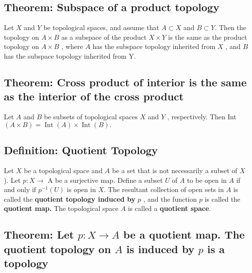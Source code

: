 \documentclass[12pt]{article}
\begin{document}
\subsection{Theorem: Subspace of a product topology}
	Let $X$ and $Y$ be topological spaces, and assume that $A \subset X$ and $B \subset Y .$ Then the topology on $A \times B$ as a subspace of the product $X \times Y$ is the same as the product topology on $A \times B$ , where $A$ has the subspace topology inherited from $X$ , and $B$ has the subspace topology inherited from Y.
\subsection{Theorem: Cross product of interior is the same as the interior of the cross product}
	Let $A$ and $B$ be subsets of topological spaces $X$ and $Y$ ,
	respectively. Then Int $( A \times B ) = \operatorname { Int } ( A ) \times \operatorname { Int } ( B) .$
\subsection{Definition: Quotient Topology}
	Let $X$ be a topological space and $A$ be a set that is not necessarily a subset of $X$ ). Let $p : X \rightarrow$ A be a surjective map. Define a subset $ U $ of $ A $ to be open in $ A $ if and only if $p ^ { - 1 } ( U )$ is open in $X .$ The resultant collection of open sets in $A$ is called the \textbf{quotient topology induced by} $p$ , and the function $ p $ is called the \textbf{quotient map.} The topological space $ A $ is called a \textbf{quotient space}.
\subsection{Theorem: Let $p : X \rightarrow A$ be a quotient map. The quotient topology on $ A $ is induced by $ p $ is a topology}
\end{document}
